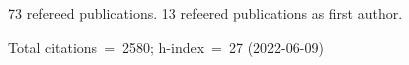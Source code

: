 73 refereed publications. 13 refeered publications as first author.

Total citations~=~2580; h-index~=~27 (2022-06-09)